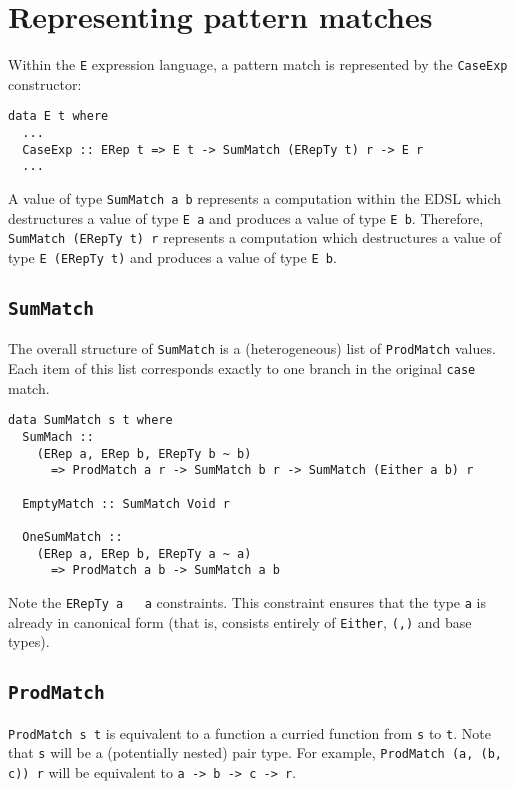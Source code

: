 \documentclass[acmsmall]{acmart}
\newcommand{\ttt}{\texttt}
\begin{document}
\section{Representing pattern matches}

Within the \ttt{E} expression language, a pattern match is represented by the
\ttt{CaseExp} constructor:

\begin{lstlisting}
data E t where
  ...
  CaseExp :: ERep t => E t -> SumMatch (ERepTy t) r -> E r
  ...
\end{lstlisting}

A value of type \ttt{SumMatch a b} represents a computation within the EDSL
which destructures a value of type \ttt{E a} and produces a value of type \ttt{E b}.
Therefore, \ttt{SumMatch (ERepTy t) r} represents a computation which destructures
a value of type \ttt{E (ERepTy t)} and produces a value of type \ttt{E b}.



\subsection{\ttt{SumMatch}}

The overall structure of \ttt{SumMatch} is a (heterogeneous) list of \ttt{ProdMatch} values.
Each item of this list corresponds exactly to one branch in the original \ttt{case} match.

\begin{lstlisting}
data SumMatch s t where
  SumMach ::
    (ERep a, ERep b, ERepTy b ~ b)
      => ProdMatch a r -> SumMatch b r -> SumMatch (Either a b) r

  EmptyMatch :: SumMatch Void r

  OneSumMatch ::
    (ERep a, ERep b, ERepTy a ~ a)
      => ProdMatch a b -> SumMatch a b
\end{lstlisting}

Note the \ttt{ERepTy a ~ a} constraints. This constraint ensures that the type \ttt{a}
is already in canonical form (that is, consists entirely of \ttt{Either}, \ttt{(,)} and
base types).

\subsection{\ttt{ProdMatch}}

\ttt{ProdMatch s t} is equivalent to a function a curried function from \ttt{s} to \ttt{t}.
Note that \ttt{s} will be a (potentially nested) pair type. For example,
\ttt{ProdMatch (a, (b, c)) r} will be equivalent to \ttt{a -> b -> c -> r}.
\end{document}
